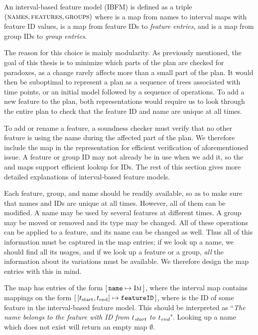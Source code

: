 \begin{definition}
  An interval-based feature model (IBFM) is defined as a triple $(\textsc{names}, \textsc{features}, \textsc{groups}{})$ where \names{} is a map from names to interval maps with feature ID values, \features{} is a map from feature IDs to \emph{feature entries}, and \groups{} is a map from group IDs to \emph{group entries}. 
  \label{def:interval-based-feature-model}
\end{definition}

The reason for this choice is mainly modularity. As previously mentioned, the goal of this thesis is to minimize which parts of the plan are checked for paradoxes, as a change rarely affects more than a small part of the plan. It would then be suboptimal to represent a plan as a sequence of trees associated with time points, or an initial model followed by a sequence of operations. To add a new feature to the plan, both representations would require us to look through the entire plan to check that the feature ID and name are unique at all times.

To add or rename a feature, a soundness checker must verify that no other feature is using the name during the affected part of the plan. We therefore include the \names{} map in the representation for efficient verification of aforementioned issue. A feature or group ID may not already be in use when we add it, so the \features{} and \groups{} maps support efficient lookup for IDs. The rest of this section gives more detailed explanations of interval-based feature models.

Each feature, group, and name should be readily available, so as to make sure that names and IDs are unique at all times. However, all of them can be modified. A name may be used by several features at different times. A group may be moved or removed and its type may be changed. All of these operations can be applied to a feature, and its name can be changed as well. Thus all of this information must be captured in the map entries; if we look up a name, we should find all its usages, and if we look up a feature or a group, \emph{all} the information about its variations must be available. We therefore design the map entries with this in mind.

The \names{} map has entries of the form $[ \,\texttt{name} \mapsto \textsc{Im}\, ]$, where the interval map  contains mappings on the form $\intervalmapping{t_\text{start}}{t_\text{end}}{\var{featureID}}$, where  is the ID of some feature in the interval-based feature model. This should be interpreted as ``\emph{The name \emph{} belongs to the feature with ID \emph{} from $t_{\emph{\text{start}}}$ to $t_{\emph{\text{end}}}$}". Looking up a name which does not exist will return an empty map $\emptyset$. 

